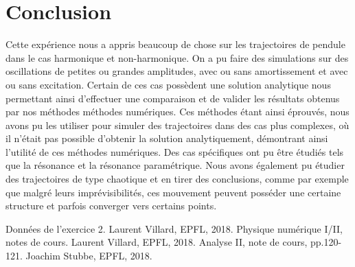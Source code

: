 \documentclass[a4paper,12pt,oneside]{article}
\begin{document}
\newpage \section{Conclusion}
Cette expérience nous a appris beaucoup de chose sur les trajectoires de pendule dans le cas harmonique et non-harmonique. On a pu faire des simulations sur des oscillations de petites ou grandes amplitudes, avec ou sans amortissement et avec ou sans excitation. Certain de ces cas possèdent une solution analytique nous permettant ainsi d'effectuer une comparaison et de valider les résultats obtenus par nos méthodes méthodes numériques. Ces méthodes étant ainsi éprouvés, nous avons pu les utiliser pour simuler des trajectoires dans des cas plus complexes, où il n'était pas possible d'obtenir la solution analytiquement, démontrant ainsi l'utilité de ces méthodes numériques. Des cas spécifiques ont pu être étudiés tels que la résonance et la résonance paramétrique. Nous avons également pu étudier des trajectoires de type chaotique et en tirer des conclusions, comme par exemple que malgré leurs imprévisibilités, ces mouvement peuvent posséder une certaine structure et parfois converger vers certains points.




\begin{thebibliography}{99}
Données de l'exercice 2. Laurent Villard, EPFL, 2018.
Physique numérique I/II, notes de cours. Laurent Villard, EPFL, 2018.
Analyse II, note de cours, pp.120-121. Joachim Stubbe, EPFL, 2018.
 \end{thebibliography}
\end{document}
